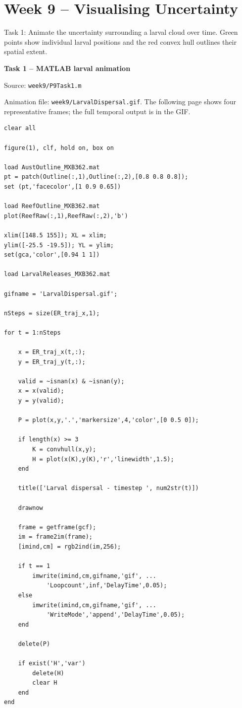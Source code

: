 \documentclass{article}
\begin{document}
\clearpage\section*{Week 9 -- Visualising Uncertainty}
Task 1: Animate the uncertainty surrounding a larval cloud over time. Green points show individual larval positions and the red convex hull outlines their spatial extent.

{\large\bfseries\color{blue} Task 1 -- MATLAB larval animation}\par{\small Source: \texttt{week9/P9Task1.m}}\par
Animation file: \texttt{week9/LarvalDispersal.gif}. The following page shows four representative frames; the full temporal output is in the GIF.
\begingroup\begin{verbatim}
clear all

figure(1), clf, hold on, box on

load AustOutline_MXB362.mat
pt = patch(Outline(:,1),Outline(:,2),[0.8 0.8 0.8]);
set (pt,'facecolor',[1 0.9 0.65])

load ReefOutline_MXB362.mat
plot(ReefRaw(:,1),ReefRaw(:,2),'b')

xlim([148.5 155]); XL = xlim;
ylim([-25.5 -19.5]); YL = ylim;
set(gca,'color',[0.94 1 1])

load LarvalReleases_MXB362.mat

gifname = 'LarvalDispersal.gif';

nSteps = size(ER_traj_x,1);

for t = 1:nSteps

    x = ER_traj_x(t,:);
    y = ER_traj_y(t,:);

    valid = ~isnan(x) & ~isnan(y);
    x = x(valid);
    y = y(valid);

    P = plot(x,y,'.','markersize',4,'color',[0 0.5 0]);

    if length(x) >= 3
        K = convhull(x,y);
        H = plot(x(K),y(K),'r','linewidth',1.5);
    end

    title(['Larval dispersal - timestep ', num2str(t)])

    drawnow

    frame = getframe(gcf);
    im = frame2im(frame);
    [imind,cm] = rgb2ind(im,256);

    if t == 1
        imwrite(imind,cm,gifname,'gif', ...
            'Loopcount',inf,'DelayTime',0.05);
    else
        imwrite(imind,cm,gifname,'gif', ...
            'WriteMode','append','DelayTime',0.05);
    end

    delete(P)

    if exist('H','var')
        delete(H)
        clear H
    end
end
\end{verbatim}
\endgroup
\end{document}
